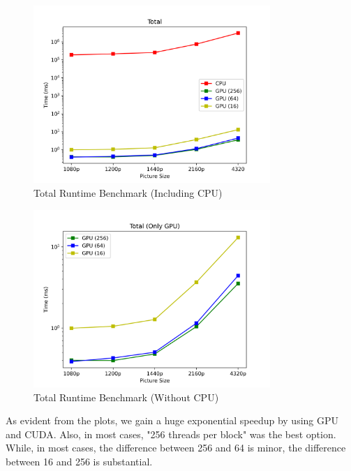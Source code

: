 \documentclass[12pt]{article}
\begin{document}
\begin{figure}[H]
	\centering
	\includegraphics[width=0.8\textwidth]{./images/Total.png}	
	\cprotect\caption{Total Runtime Benchmark  (Including CPU)}
	\label{fig:5}
\end{figure}



\begin{figure}[H]
	\centering
	\includegraphics[width=0.8\textwidth]{./images/Total2.png}	
	\cprotect\caption{Total Runtime Benchmark  (Without CPU)}
	\label{fig:6}
\end{figure}

As evident from the plots, we gain a huge exponential speedup by using GPU and CUDA. Also, in most cases, "256 threads per block" was the best option. While, in most cases, the difference between 256 and 64 is minor, the difference between 16 and 256 is substantial.
\end{document}
